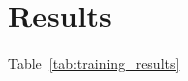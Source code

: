 \documentclass{llncs}
\begin{document}
	\section{Results} {
	\label{sec:results}






		Table~\ref{tab:training_results}

}
\end{document}
